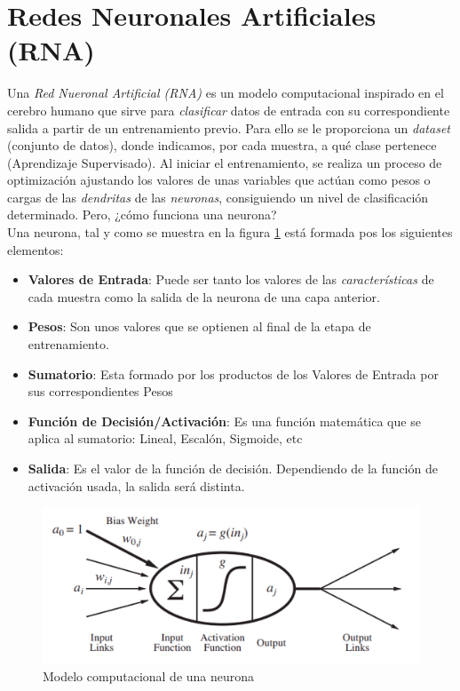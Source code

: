 \section{Redes Neuronales Artificiales (RNA)}
\label{sec:redes_neuronales}

Una \textit{Red Nueronal Artificial (RNA)} es un modelo computacional inspirado en el cerebro humano que sirve para \textit{clasificar} datos de entrada con su correspondiente salida a partir de un entrenamiento previo. Para ello se le proporciona un \textit{dataset} (conjunto de datos), donde indicamos, por cada muestra, a qué clase pertenece (Aprendizaje Supervisado). Al iniciar el entrenamiento, se realiza un proceso de optimización ajustando los valores de unas variables que actúan como pesos o cargas de las \textit{dendritas} de las \textit{neuronas}, consiguiendo un nivel de clasificación determinado. Pero, ¿cómo funciona una neurona?\\

Una neurona, tal y como se muestra en la figura \ref{fig:neurona} está formada pos los siguientes elementos:
\begin{itemize}
	\item \textbf{Valores de Entrada}: Puede ser tanto los valores de las \textit{características} de cada muestra como la salida de la neurona de una capa anterior.
	\item \textbf{Pesos}: Son unos valores que se optienen al final de la etapa de entrenamiento.
	\item \textbf{Sumatorio}: Esta formado por los productos de los Valores de Entrada por sus correspondientes Pesos
	\item \textbf{Función de Decisión/Activación}: Es una función matemática que se aplica al sumatorio: Lineal, Escalón, Sigmoide, etc
	\item \textbf{Salida}: Es el valor de la función de decisión. Dependiendo de la función de activación usada, la salida será distinta.
\end{itemize}

\begin{figure}[H]
  \begin{center}
    \includegraphics[width=15cm]{imagenes/cap1/neurona.png}
  \end{center}
  \caption[Modelo computacional de una neurona]{Modelo computacional de una neurona \cite{AIMA}}
  \label{fig:neurona}
\end{figure}

